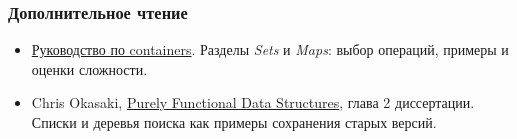 \documentclass[11pt]{beamer}
\begin{document}
\begin{frame}
  \frametitle{Дополнительное чтение}
  \begin{itemize}
    \item \href{https://haskell-containers.readthedocs.io/en/latest/}{Руководство по containers}. Разделы \emph{Sets} и \emph{Maps}: выбор операций, примеры и оценки сложности.
    \item Chris Okasaki, \href{https://www.cs.cmu.edu/~rwh/students/okasaki.pdf}{Purely Functional Data Structures}, глава 2 диссертации. Списки и деревья поиска как примеры сохранения старых версий.
  \end{itemize}
\end{frame}
\end{document}

